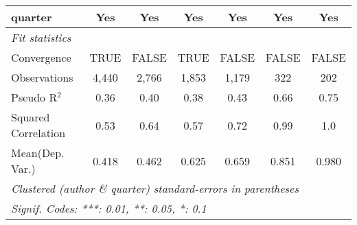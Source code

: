 \begin{tabular}{lcccccc}
   quarter                                                    & Yes          & Yes         & Yes           & Yes           & Yes        & Yes\\  
   \midrule
   \emph{Fit statistics}\\
   Convergence                                                &TRUE          & FALSE       & TRUE          & FALSE         & FALSE      & FALSE\\  
   Observations                                               & 4,440        & 2,766       & 1,853         & 1,179         & 322        & 202\\  
   Pseudo R$^2$                                               & 0.36         & 0.40        & 0.38          & 0.43          & 0.66       & 0.75\\  
   Squared Correlation                                        & 0.53         & 0.64        & 0.57          & 0.72          & 0.99       & 1.0\\  
Mean(Dep. Var.) & 0.418 & 0.462 & 0.625 & 0.659 & 0.851 & 0.980 \\
   \midrule \midrule
   \multicolumn{7}{l}{\emph{Clustered (author \& quarter) standard-errors in parentheses}}\\
   \multicolumn{7}{l}{\emph{Signif. Codes: ***: 0.01, **: 0.05, *: 0.1}}\\
\end{tabular}
\par\endgroup
